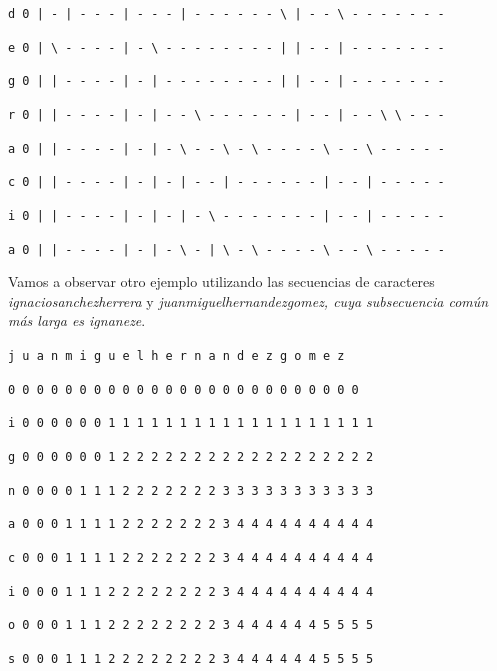\documentclass[11pt,a4paper]{article} %
\begin{document}
\texttt{d 0 | - | - - - | - - - | - - - - - - \textbackslash{ }| - - \textbackslash{ }- - - - - - -}

\texttt{e 0 | \textbackslash{ }- - - - | - \textbackslash{ }- - - - - - - - | | - - | - - - - - - -}

\texttt{g 0 | | - - - - | - | - - - - - - - - | | - - | - - - - - - -}

\texttt{r 0 | | - - - - | - | - - \textbackslash{ }- - - - - - | - - | - - \textbackslash{ }\textbackslash{ }- - -}

\texttt{a 0 | | - - - - | - | - \textbackslash{ }- - \textbackslash{ }- \textbackslash{ }- - - - \textbackslash{ }- - \textbackslash{ }- - - - -}

\texttt{c 0 | | - - - - | - | - | - - | - - - - - - | - - | - - - - -}

\texttt{i 0 | | - - - - | - | - | - \textbackslash{ }- - - - - - - | - - | - - - - -}

\texttt{a 0 | | - - - - | - | - \textbackslash{ }- | \textbackslash{ }- \textbackslash{ }- - - - \textbackslash{ }- - \textbackslash{ }- - - - -}

\normalsize


Vamos a observar otro ejemplo utilizando las secuencias de caracteres \textit{ignaciosanchezherrera} y \textit{juanmiguelhernandezgomez, cuya subsecuencia común más larga es \textit{ignaneze}}.\\

\small

\hspace{1,72 em} \texttt{j u a n m i g u e l h e r n a n d e z g o m e z}

\hspace{0,71 em} \texttt{0 0 0 0 0 0 0 0 0 0 0 0 0 0 0 0 0 0 0 0 0 0 0 0 0}

\texttt{i 0 0 0 0 0 0 1 1 1 1 1 1 1 1 1 1 1 1 1 1 1 1 1 1 1}

\texttt{g 0 0 0 0 0 0 1 2 2 2 2 2 2 2 2 2 2 2 2 2 2 2 2 2 2}

\texttt{n 0 0 0 0 1 1 1 2 2 2 2 2 2 2 3 3 3 3 3 3 3 3 3 3 3}

\texttt{a 0 0 0 1 1 1 1 2 2 2 2 2 2 2 3 4 4 4 4 4 4 4 4 4 4}

\texttt{c 0 0 0 1 1 1 1 2 2 2 2 2 2 2 3 4 4 4 4 4 4 4 4 4 4}

\texttt{i 0 0 0 1 1 1 2 2 2 2 2 2 2 2 3 4 4 4 4 4 4 4 4 4 4}

\texttt{o 0 0 0 1 1 1 2 2 2 2 2 2 2 2 3 4 4 4 4 4 4 5 5 5 5}

\texttt{s 0 0 0 1 1 1 2 2 2 2 2 2 2 2 3 4 4 4 4 4 4 5 5 5 5}
\end{document}
